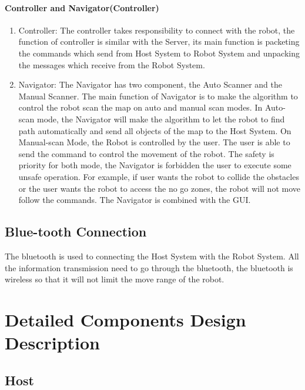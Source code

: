 \documentclass[11pt, a4paper]{report}
\begin{document}
\paragraph{Controller and Navigator(Controller)}
\begin{enumerate}
\item Controller: The controller takes responsibility to connect with the robot, the function of controller is similar with the Server, its main function is packeting the commands which send from Host System to Robot System and unpacking  the messages which receive from the Robot System.
\item Navigator: The Navigator has two component, the Auto Scanner and the Manual Scanner. The main function of Navigator is to make the algorithm to control the robot scan the map on auto and manual scan modes. In Auto-scan mode, the Navigator will make the algorithm to let the robot to find path automatically and send all objects of the map to the Host System. On Manual-scan Mode, the Robot is controlled by the user. The user is able to send the command to control the movement of the robot. The safety is priority for both mode, the Navigator is forbidden the user to execute some unsafe operation. For example, if user wants the robot to collide the obstacles or the user wants the robot to access the no go zones, the robot will not move follow the commands. The Navigator is combined with  the GUI.    
\end{enumerate}
\subsection{Blue-tooth Connection}
The bluetooth is used to connecting the Host System with the Robot System. All the information transmission need to go through the bluetooth, the bluetooth is wireless so that it will not limit the move range of the robot.   



\section{Detailed Components Design Description}
\subsection{Host}
\end{document}
